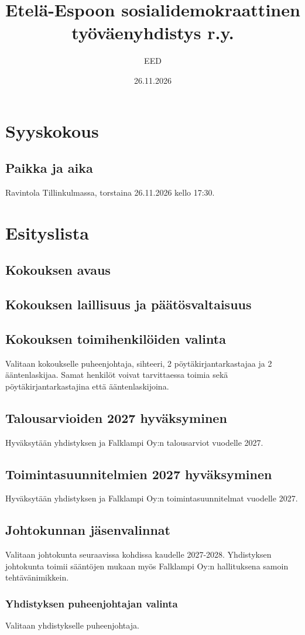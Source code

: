 \documentclass[a4paper,12pt]{article}
\title{Etelä-Espoon sosialidemokraattinen työväenyhdistys r.y.}
\author{EED}
\date{26.11.2026}
\begin{document}
\maketitle
\tableofcontents
\section*{Syyskokous}
\subsection*{Paikka ja aika}
Ravintola Tillinkulmassa, torstaina 26.11.2026 kello 17:30.
\section*{Esityslista}
\subsection{Kokouksen avaus}
\subsection{Kokouksen laillisuus ja päätösvaltaisuus}
\subsection{Kokouksen toimihenkilöiden valinta}
Valitaan kokoukselle puheenjohtaja, sihteeri, 2 pöytäkirjantarkastajaa ja 2 ääntenlaskijaa. Samat henkilöt voivat tarvittaessa toimia sekä pöytäkirjantarkastajina että ääntenlaskijoina.
\subsection{Talousarvioiden 2027 hyväksyminen}
Hyväksytään yhdistyksen ja Falklampi Oy:n talousarviot vuodelle 2027.
\subsection{Toimintasuunnitelmien 2027 hyväksyminen}
Hyväksytään yhdistyksen ja Falklampi Oy:n toimintasuunnitelmat vuodelle 2027.
\subsection{Johtokunnan jäsenvalinnat}
Valitaan johtokunta seuraavissa kohdissa kaudelle 2027-2028. Yhdistyksen johtokunta toimii sääntöjen mukaan myös Falklampi Oy:n hallituksena samoin tehtävänimikkein.
\subsubsection{Yhdistyksen puheenjohtajan valinta}
Valitaan yhdistykselle puheenjohtaja.
\end{document}
